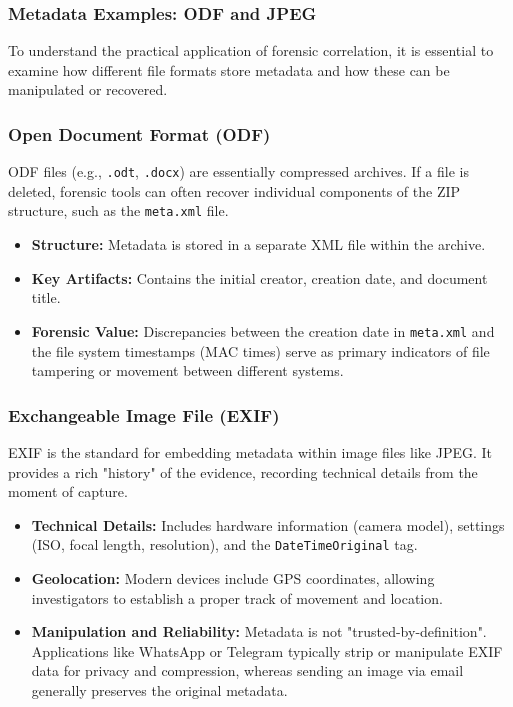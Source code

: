 \subsubsection{Metadata Examples: ODF and JPEG}

To understand the practical application of forensic correlation, it is essential to examine how different file formats store metadata and how these can be manipulated or recovered. 

\subsubsection*{Open Document Format (ODF)}
ODF files (e.g., \texttt{.odt}, \texttt{.docx}) are essentially compressed archives. If a file is deleted, forensic tools can often recover individual components of the ZIP structure, such as the \texttt{meta.xml} file.

\begin{itemize}
    \item \textbf{Structure:} Metadata is stored in a separate XML file within the archive.
    \item \textbf{Key Artifacts:} Contains the initial creator, creation date, and document title.
    \item \textbf{Forensic Value:} Discrepancies between the creation date in \texttt{meta.xml} and the file system timestamps (MAC times) serve as primary indicators of file tampering or movement between different systems.
\end{itemize}

\subsubsection*{Exchangeable Image File (EXIF)}
EXIF is the standard for embedding metadata within image files like JPEG. It provides a rich "history" of the evidence, recording technical details from the moment of capture.

\begin{itemize}
    \item \textbf{Technical Details:} Includes hardware information (camera model), settings (ISO, focal length, resolution), and the \texttt{DateTimeOriginal} tag.
    \item \textbf{Geolocation:} Modern devices include GPS coordinates, allowing investigators to establish a proper track of movement and location.
    \item \textbf{Manipulation and Reliability:} Metadata is not "trusted-by-definition". Applications like WhatsApp or Telegram typically strip or manipulate EXIF data for privacy and compression, whereas sending an image via email generally preserves the original metadata.
\end{itemize}

